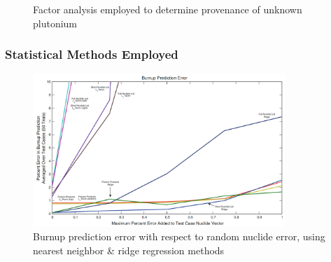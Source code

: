 \begin{frame}
\begin{minipage}[t]{0.45\textwidth}
\begin{figure}
      \caption{Factor analysis employed to determine provenance of unknown plutonium \cite{nicolaou_pu}}
    \end{figure}
  \end{minipage}
\end{frame}

\begin{frame}
  \frametitle{Statistical Methods Employed}
  \begin{figure}
    \centering
    \includegraphics[width=0.85\textwidth]{./figures/randomerror.png}
    \caption{Burnup prediction error with respect to random nuclide error, using nearest neighbor \& ridge regression methods \cite{dayman_feasibility_2013}}
  \end{figure}
\end{frame}
